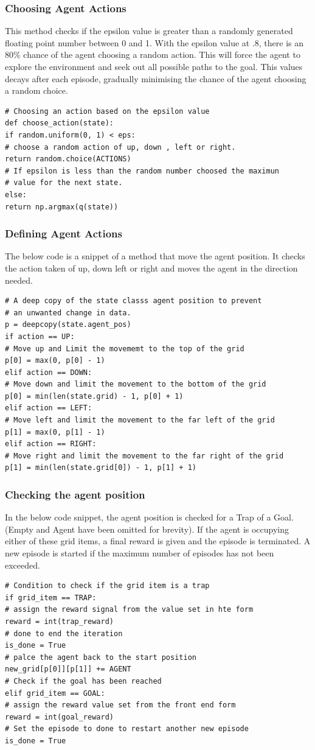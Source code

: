 \subsubsection{Choosing Agent Actions}
This method checks if the epsilon value is greater than a randomly generated
floating point number between 0 and 1.
With the epsilon  value at .8, there is an 80\% chance of the 
agent choosing a random action.
This will force the agent to explore the environment and seek 
out all possible paths to the goal.
This values decays after each episode, gradually minimising the
chance of the agent choosing a random choice.
\begin{verbatim}
# Choosing an action based on the epsilon value
def choose_action(state):
if random.uniform(0, 1) < eps:
# choose a random action of up, down , left or right.
return random.choice(ACTIONS)
# If epsilon is less than the random number choosed the maximun
# value for the next state.
else:
return np.argmax(q(state))
\end{verbatim}
\subsubsection{Defining Agent Actions}
The below code is a snippet of a method that move the agent position. It checks the action taken of up, down left or right and moves the agent in the direction needed. 
\begin{verbatim}
# A deep copy of the state classs agent position to prevent
# an unwanted change in data.
p = deepcopy(state.agent_pos)
if action == UP:
# Move up and Limit the movememt to the top of the grid
p[0] = max(0, p[0] - 1)
elif action == DOWN:
# Move down and limit the movement to the bottom of the grid
p[0] = min(len(state.grid) - 1, p[0] + 1)
elif action == LEFT:
# Move left and limit the movement to the far left of the grid
p[1] = max(0, p[1] - 1)
elif action == RIGHT:
# Move right and limit the movement to the far right of the grid
p[1] = min(len(state.grid[0]) - 1, p[1] + 1)
\end{verbatim}
\subsubsection{Checking the agent position}
In the below code snippet, the agent position is checked for a Trap of a Goal. (Empty and Agent have been omitted for brevity). If the agent is occupying either of these grid items, a final reward is given and the episode is terminated. A new episode is started if the maximum number of episodes has not been exceeded.
\begin{verbatim}
# Condition to check if the grid item is a trap 
if grid_item == TRAP:
# assign the reward signal from the value set in hte form
reward = int(trap_reward)
# done to end the iteration
is_done = True
# palce the agent back to the start position
new_grid[p[0]][p[1]] += AGENT
# Check if the goal has been reached
elif grid_item == GOAL:
# assign the reward value set from the front end form
reward = int(goal_reward)
# Set the episode to done to restart another new episode
is_done = True
\end{verbatim}
